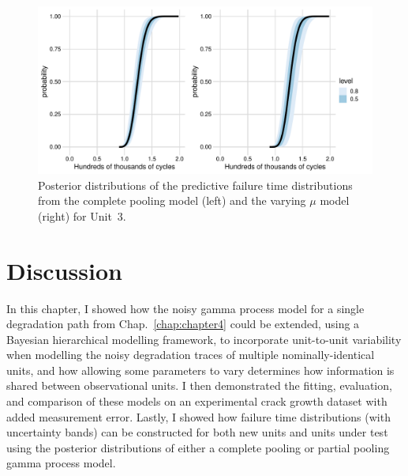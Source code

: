 \begin{figure}
    \centering
    \includegraphics[width=0.95\columnwidth]{./figures/ch-5/FT_dist_Unit3.pdf}
    \caption{Posterior distributions of the predictive failure time distributions from the complete pooling model (left) and the varying $\mu$ model (right) for Unit~3.}
    \label{fig:FT_CP_VM_U3}
\end{figure}

\section{Discussion} \label{sec:unit-to-unit-discussion}

In this chapter, I showed how the noisy gamma process model for a single degradation path from Chap.~\ref{chap:chapter4} could be extended, using a Bayesian hierarchical modelling framework, to incorporate unit-to-unit variability when modelling the noisy degradation traces of multiple nominally-identical units, and how allowing some parameters to vary determines how information is shared between observational units. I then demonstrated the fitting, evaluation, and comparison of these models on an experimental crack growth dataset with added measurement error. Lastly, I showed how failure time distributions (with uncertainty bands) can be constructed for both new units and units under test using the posterior distributions of either a complete pooling or partial pooling gamma process model.

